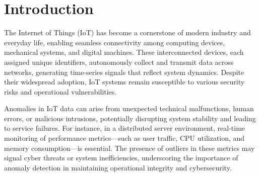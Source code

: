 \documentclass[sigconf]{acmart}
\begin{document}



\maketitle

\section{Introduction}

The Internet of Things (IoT) has become a cornerstone of modern industry and everyday life, 
enabling seamless connectivity among computing devices, mechanical systems, and
digital machines. These interconnected devices, each assigned unique identifiers,
autonomously collect and transmit data across networks, generating time-series
signals that reflect system dynamics. Despite their widespread adoption,
IoT systems remain susceptible to various security risks and operational vulnerabilities.

Anomalies in IoT data can arise from unexpected technical malfunctions, human errors,
or malicious intrusions, potentially disrupting system stability and leading to service failures.
For instance, in a distributed server environment, real-time monitoring of performance metrics—such as user traffic,
CPU utilization, and memory consumption—is essential. The presence of outliers in these metrics may signal cyber
threats or system inefficiencies, underscoring the importance of
anomaly detection in maintaining operational integrity and cybersecurity.
\end{document}
